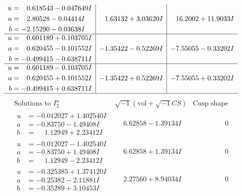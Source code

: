 \documentclass[1p]{elsarticle_modified}
\theoremstyle{definition}
\newcommand{\I}{\sqrt{-1}}
\begin{document}
$$\begin{array}{c|c|c}
\begin{aligned}
u &= \phantom{-}0.618543 - 0.047649 I \\
a &= \phantom{-}2.80528 - 0.04414 I \\
b &= -2.15290 - 0.03638 I\end{aligned}
 & \phantom{-}1.63132 + 3.03620 I & \phantom{-}16.2002 + 11.9033 I \\ \hline\begin{aligned}
u &= \phantom{-}0.601189 + 0.103705 I \\
a &= \phantom{-}0.620455 - 0.101552 I \\
b &= -0.499415 - 0.638711 I\end{aligned}
 & -1.35422 - 0.52269 I & -7.55055 - 0.33202 I \\ \hline\begin{aligned}
u &= \phantom{-}0.601189 - 0.103705 I \\
a &= \phantom{-}0.620455 + 0.101552 I \\
b &= -0.499415 + 0.638711 I\end{aligned}
 & -1.35422 + 0.52269 I & -7.55055 + 0.33202 I\\
 \hline 
 \end{array}$$\newpage$$\begin{array}{c|c|c}  
\text{Solutions to }I^u_{2}& \I (\text{vol} + \sqrt{-1}CS) & \text{Cusp shape}\\
 \hline 
\begin{aligned}
u &= -0.012027 + 1.402540 I \\
a &= -0.83750 - 1.49408 I \\
b &= \phantom{-}1.12949 + 2.23412 I\end{aligned}
 & \phantom{-}6.62858 - 1.39134 I & \phantom{-0.000000 } 0 \\ \hline\begin{aligned}
u &= -0.012027 - 1.402540 I \\
a &= -0.83750 + 1.49408 I \\
b &= \phantom{-}1.12949 - 2.23412 I\end{aligned}
 & \phantom{-}6.62858 + 1.39134 I & \phantom{-0.000000 } 0 \\ \hline\begin{aligned}
u &= -0.325385 + 1.374120 I \\
a &= -0.25382 - 2.11881 I \\
b &= -0.35289 + 3.10453 I\end{aligned}
 & \phantom{-}2.27560 + 8.94034 I & \phantom{-0.000000 } 0 \\ \hline\begin{aligned}

\end{aligned}
\end{array}$$
\end{document}
